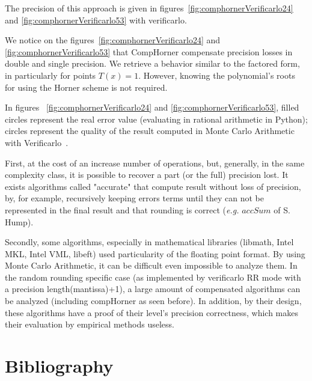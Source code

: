 \documentclass{TP}
\begin{document}
The precision of this approach is given in figures~\ref{fig:comphornerVerificarlo24} and \ref{fig:comphornerVerificarlo53} with verificarlo.

We notice on the figures~\ref{fig:comphornerVerificarlo24} and \ref{fig:comphornerVerificarlo53} that CompHorner compensate precision losses in double and single precision. We retrieve a behavior similar to the factored form, in particularly for points $T(x)=1$. However, knowing the polynomial's roots for using the Horner scheme is not required.

In figures ~\ref{fig:comphornerVerificarlo24} and \ref{fig:comphornerVerificarlo53}, filled circles represent the real error value (evaluating in rational arithmetic in Python); circles represent the quality of the result computed in Monte Carlo Arithmetic with Verificarlo~\cite{verrou}.

First, at the cost of an increase number of operations, but, generally, in the same complexity class, it is possible to recover a part (or the full) precision lost. It exists algorithms called "accurate" that compute result without loss of precision, by, for example, recursively keeping errors terms until they can not be represented in the final result and that rounding is correct ({\it e.g.} $accSum$ of S. Hump).

Secondly, some algorithms, especially in mathematical libraries (libmath, Intel MKL, Intel VML, libeft) used particularity of the floating point format. By using Monte Carlo Arithmetic, it can be difficult even impossible to analyze them. In the random rounding specific case (as implemented by verificarlo RR mode with a precision length(mantissa)+1), a large amount of compensated algorithms can be analyzed (including compHorner as seen before). In addition, by their design, these algorithms have a proof of their level's precision correctness, which makes their evaluation by empirical methods useless.

\newpage

\section{Bibliography}

\end{document}
